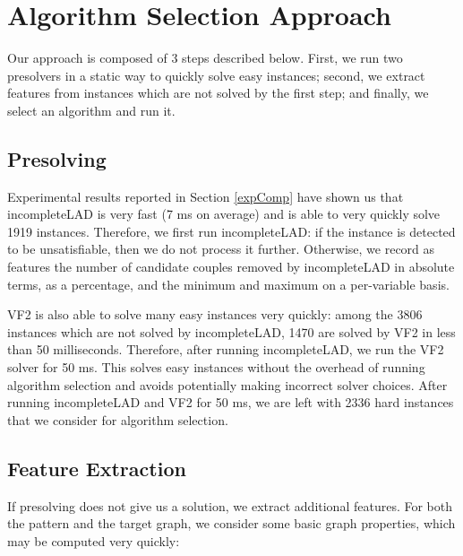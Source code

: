 \documentclass{llncs}
\begin{document}
\section{Algorithm Selection Approach}

Our approach is composed of 3 steps described below. First, we run two presolvers in a static way to
quickly solve easy instances; second, we extract features from instances which are not solved by the
first step; and finally, we select an algorithm and run it.

\subsection{Presolving}

Experimental results reported in Section \ref{expComp} have shown us that incompleteLAD is very fast
(7 ms on average) and is able to very quickly solve 1919 instances. Therefore, we first run
incompleteLAD: if the instance is detected to be unsatisfiable, then we do not process it further.
Otherwise, we record as features the number of candidate couples removed by incompleteLAD in absolute
terms, as a percentage, and the minimum and maximum on a per-variable basis.

VF2 is also able to solve many easy instances very quickly: among the 3806 instances which are not
solved by incompleteLAD, 1470 are solved by VF2 in less than 50 milliseconds. Therefore, after
running incompleteLAD, we run the VF2 solver for 50 ms. This solves easy instances without the
overhead of running algorithm selection and avoids potentially making incorrect solver choices.
After running incompleteLAD and VF2 for 50 ms, we are left with 2336 hard instances that we consider
for algorithm selection.

\subsection{Feature Extraction}

If presolving does not give us a solution, we extract additional features. For both the pattern and
the target graph, we consider some basic graph properties, which may be computed very quickly:
\end{document}
